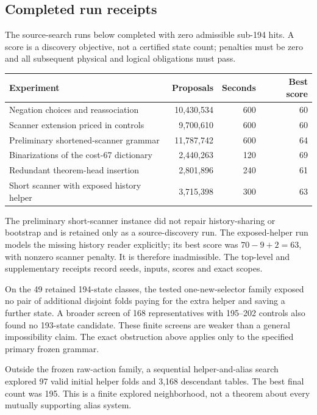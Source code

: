 \subsection{Completed run receipts}
The source-search runs below completed with zero admissible sub-194 hits. A score is a discovery objective, not a certified state count; penalties must be zero and all subsequent physical and logical obligations must pass.
\begin{center}\small
\begin{tabular}{p{.42\linewidth}rrr}
\toprule
Experiment & Proposals & Seconds & Best score\\
\midrule
Negation choices and reassociation &10,430,534&600&60\\
Scanner extension priced in controls &9,700,610&600&60\\
Preliminary shortened-scanner grammar &11,787,742&600&64\\
Binarizations of the cost-67 dictionary &2,440,263&120&69\\
Redundant theorem-head insertion &2,801,896&240&61\\
Short scanner with exposed history helper &3,715,398&300&63\\
\bottomrule
\end{tabular}
\end{center}
The preliminary short-scanner instance did not repair history-sharing or bootstrap and is retained only as a source-discovery run. The exposed-helper run models the missing history reader explicitly; its best score was $70-9+2=63$, with nonzero scanner penalty. It is therefore inadmissible. The top-level  and supplementary receipts record seeds, inputs, scores and exact scopes.

On the 49 retained 194-state classes, the tested one-new-selector family exposed no pair of additional disjoint folds paying for the extra helper and saving a further state. A broader screen of 168 representatives with 195--202 controls also found no 193-state candidate. These finite screens are weaker than a general impossibility claim. The exact obstruction above applies only to the specified primary frozen grammar.

Outside the frozen raw-action family, a sequential helper-and-alias search explored 97 valid initial helper folds and 3,168 descendant tables. The best final count was 195. This is a finite explored neighborhood, not a theorem about every mutually supporting alias system.
